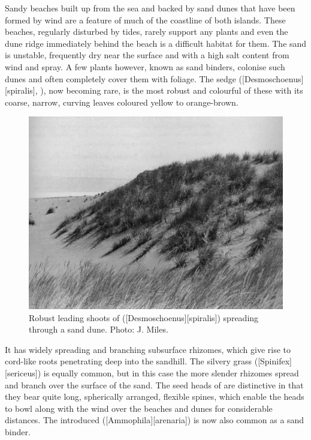 Sandy beaches built up from the sea and backed by sand dunes that have been formed by wind are a feature of much of the coastline of both islands.
These beaches, regularly disturbed by tides, rarely support any plants and even the dune ridge immediately behind the beach is a difficult habitat for them.
The sand is unstable, frequently dry near the surface and with a high salt content from wind and spray.
A few plants however, known as sand binders, colonise such dunes and often completely cover them with foliage.
The sedge  ([Desmoschoenus][spiralis], ), now becoming rare, is the most robust and colourful of these with its coarse, narrow, curving leaves coloured yellow to orange-brown.
\begin{figure}[t]
	\includegraphics[width=\textwidth]{graphics/figure88pingao.jpg}
	\centering
	\caption[Robust leading shoots of pingao]{Robust leading shoots of  ([Desmoschoenus][spiralis]) spreading through a sand dune.
	Photo: J. Miles.}%
	\label{fig:88pingao}
\end{figure}
It has widely spreading and branching subsurface rhizomes, which give rise to cord-like roots penetrating deep into the sandhill.
The silvery grass  ([Spinifex][sericeus]) is equally common, but in this case the more slender rhizomes spread and branch over the surface of the sand.
The seed heads of  are distinctive in that they bear quite long, spherically arranged, flexible spines, which enable the heads to bowl along with the wind over the beaches and dunes for considerable distances.
The introduced  ([Ammophila][arenaria]) is now also common as a sand binder.

